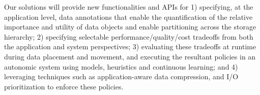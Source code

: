 \documentclass[11pt,letterpaper]{article}
\begin{document}
Our solutions will provide  new functionalities and APIs for
\setlength{\parindent}{0cm}
%
1) specifying, at the application level, data annotations that enable the
quantification of the relative importance and utility of data objects and
enable partitioning  across the storage hierarchy;
%
2) specifying selectable performance/quality/cost tradeoffs from both the
application and system perspectives;
%
3) evaluating these tradeoffs at runtime during data placement and movement,
and executing the resultant policies in an autonomic system using models,
heuristics and continuous learning; and
%
4) leveraging techniques such as application-aware data compression, 
and I/O prioritization to enforce these
policies.
  
  \setlength{\parindent}{0.5cm}
  


  \setlength{\parindent}{0.5cm}






\end{document}
